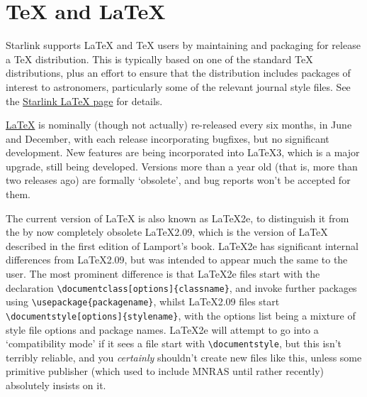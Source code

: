 \documentclass[11pt,oneside,chapters]{starlink}
\begin{document}
\section{TeX and LaTeX}
\label{s:latex}


Starlink supports LaTeX and TeX users by maintaining and
packaging for release a TeX distribution.  This is typically based
on one of the standard TeX distributions, plus an effort to ensure
that the distribution includes packages of interest to astronomers,
particularly some of the relevant journal style files.  See the
\href{http://www.starlink.ac.uk/%7eacc/tex/tex.html}{Starlink LaTeX page}
for details.

\href{http://www.latex-project.org/}{LaTeX} is
nominally (though not actually)
re-released every six months, in June and December, with
each release incorporating bugfixes, but no significant development.
New features are being incorporated into LaTeX3, which is a major
upgrade, still being developed.  Versions more than a year old (that
is, more than two releases ago) are formally `obsolete', and bug reports
won't be accepted for them.

The current version of LaTeX is also known as LaTeX2e, to
distinguish it from the by now completely obsolete LaTeX2.09, which
is the version of LaTeX described in the first edition of Lamport's
book.  LaTeX2e has significant internal differences from
LaTeX2.09, but was intended to appear much the same to the user.
The most prominent difference is that LaTeX2e files start with the
declaration \texttt{\textbackslash{}documentclass[options]\{classname\}}, and
invoke further packages using \texttt{\textbackslash{}usepackage\{packagename\}},
whilst LaTeX2.09 files start
\texttt{\textbackslash{}documentstyle[options]\{stylename\}}, with the options list
being a mixture of style file options and package names.  LaTeX2e
will attempt to go into a `compatibility mode' if it sees a file start
with \texttt{\textbackslash{}documentstyle}, but this isn't terribly reliable,
and you \emph{certainly} shouldn't create new files like this,
unless some primitive publisher (which used to include MNRAS until
rather recently) absolutely insists on it.
\end{document}
